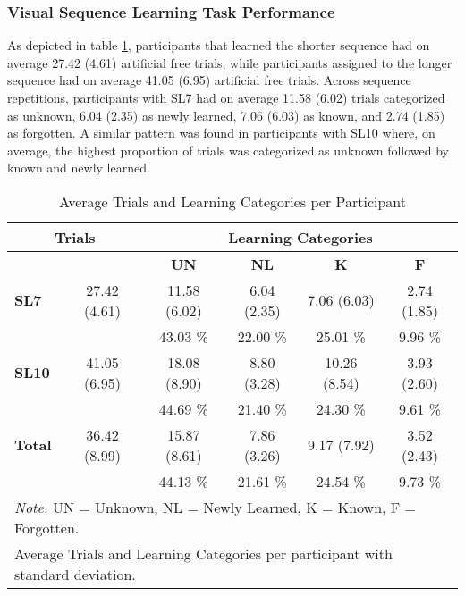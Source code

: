 \subsubsection{Visual Sequence Learning Task Performance}
As depicted in table \ref{tab:avgTLS}, participants that learned the shorter sequence had on average 27.42 (4.61) artificial free trials, while participants assigned to the longer sequence had on average 41.05 (6.95) artificial free trials. Across sequence repetitions, participants with SL7 had on average 11.58 (6.02) trials categorized as unknown, 6.04 (2.35) as newly learned, 7.06 (6.03) as known, and 2.74 (1.85) as forgotten. A similar pattern was found in participants with SL10 where, on average, the highest proportion of trials was categorized as unknown followed by known and newly learned. 
\begin{table}[H]
\centering
\begin{tabular}{lccccc}
\hline

\multicolumn{2}{c}{\textbf{Trials}}                & \multicolumn{4}{c}{\textbf{Learning Categories}}                     \\ \hline
            &   & \textbf{UN} & \textbf{NL} & \textbf{K} & \textbf{F} \\ \cline{3-6} 
\textbf{SL7}    & 27.42 (4.61)                              & 11.58 (6.02)      & 6.04 (2.35)       & 7.06 (6.03)      & 2.74 (1.85)     \\
&&43.03 \% & 22.00 \% &25.01 \%&9.96 \%\\
\textbf{SL10}   & 41.05 (6.95)                               & 18.08 (8.90)      & 8.80 (3.28)       & 10.26 (8.54)     & 3.93 (2.60)      \\
&& 44.69 \% & 21.40 \% & 24.30 \% & 9.61 \% \\
\textbf{Total} & 36.42 (8.99)                              & 15.87 (8.61)      & 7.86 (3.26)     & 9.17 (7.92)     & 3.52 (2.43)      \\
&& 44.13 \% &21.61 \% &24.54 \% & 9.73 \% \\\hline 
\multicolumn{6}{l}{\small \textit{Note.} UN = Unknown, NL = Newly Learned, K = Known, F = Forgotten.}\\[-0.3cm]
\multicolumn{6}{l}{\small Average Trials and Learning Categories per participant with standard deviation.}
\end{tabular}
\caption{Average Trials and Learning Categories per Participant}
\label{tab:avgTLS}
\end{table}







